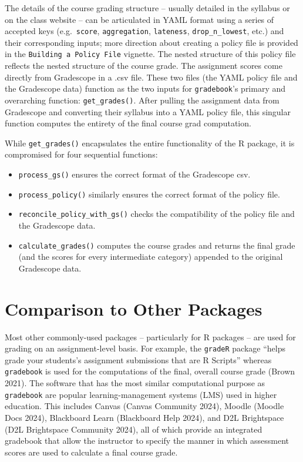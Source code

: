 \documentclass[10pt,a4paper,onecolumn]{article}
\begin{document}
The details of the course grading structure -- usually detailed in the
syllabus or on the class website -- can be articulated in YAML format
using a series of accepted keys (e.g.~\texttt{score},
\texttt{aggregation}, \texttt{lateness}, \texttt{drop\_n\_lowest}, etc.)
and their corresponding inputs; more direction about creating a policy
file is provided in the \texttt{Building\ a\ Policy\ File} vignette. The
nested structure of this policy file reflects the nested structure of
the course grade. The assignment scores come directly from Gradescope in
a .csv file. These two files (the YAML policy file and the Gradescope
data) function as the two inputs for \texttt{gradebook}'s primary and
overarching function: \texttt{get\_grades()}. After pulling the
assignment data from Gradescope and converting their syllabus into a
YAML policy file, this singular function computes the entirety of the
final course grad computation.

While \texttt{get\_grades()} encapsulates the entire functionality of
the R package, it is compromised for four sequential functions:

\begin{itemize}
\item
  \texttt{process\_gs()} ensures the correct format of the Gradescope
  csv.
\item
  \texttt{process\_policy()} similarly ensures the correct format of the
  policy file.
\item
  \texttt{reconcile\_policy\_with\_gs()} checks the compatibility of the
  policy file and the Gradescope data.
\item
  \texttt{calculate\_grades()} computes the course grades and returns
  the final grade (and the scores for every intermediate category)
  appended to the original Gradescope data.
\end{itemize}

\hypertarget{comparison-to-other-packages}{%
\section{Comparison to Other
Packages}\label{comparison-to-other-packages}}

Most other commonly-used packages -- particularly for R packages -- are
used for grading on an assignment-level basis. For example, the
\texttt{gradeR} package ``helps grade your students's assignment
submissions that are R Scripts'' whereas \texttt{gradebook} is used for
the computations of the final, overall course grade (Brown 2021). The
software that has the most similar computational purpose as
\texttt{gradebook} are popular learning-management systems (LMS) used in
higher education. This includes Canvas (Canvas Community 2024), Moodle
(Moodle Docs 2024), Blackboard Learn (Blackboard Help 2024), and D2L
Brightspace (D2L Brightspace Community 2024), all of which provide an
integrated gradebook that allow the instructor to specify the manner in
which assessment scores are used to calculate a final course grade.
\end{document}
